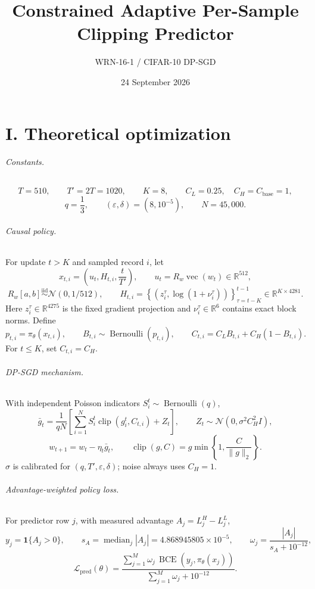 \documentclass[10pt]{article}
\title{Constrained Adaptive Per-Sample Clipping Predictor}
\author{WRN-16-1 / CIFAR-10 DP-SGD}
\date{24 September 2026}
\newcommand{\R}{\mathbb{R}}
\newcommand{\clip}{\operatorname{clip}}
\newcommand{\BCE}{\operatorname{BCE}}
\newcommand{\1}{\mathbf{1}}
\begin{document}
\maketitle
\vspace{-1.5em}

\part*{I. Theoretical optimization}

\paragraph{Constants.}
\[
T=510,\qquad T'=2T=1020,\qquad K=8,\qquad
C_L=0.25,\quad C_H=C_{\mathrm{base}}=1,
\]
\[
q=\frac13,\qquad (\varepsilon,\delta)=(8,10^{-5}),\qquad
N=45{,}000.
\]

\paragraph{Causal policy.}
For update $t>K$ and sampled record $i$, let
\[
x_{t,i}=\left(u_t,H_{t,i},\frac{t}{T'}\right),\qquad
u_t=R_w\operatorname{vec}(w_t)\in\R^{512},
\]
\[
R_w[a,b]\overset{\mathrm{iid}}{\sim}\mathcal N(0,1/512),\qquad
H_{t,i}=\left\{(z_i^\tau,\log(1+\nu_i^\tau))\right\}_{\tau=t-K}^{t-1}
\in\R^{K\times4281}.
\]
Here $z_i^\tau\in\R^{4275}$ is the fixed gradient projection and
$\nu_i^\tau\in\R^6$ contains exact block norms. Define
\[
p_{t,i}=\pi_\theta(x_{t,i}),\qquad
B_{t,i}\sim\operatorname{Bernoulli}(p_{t,i}),\qquad
C_{t,i}=C_LB_{t,i}+C_H(1-B_{t,i}).
\]
For $t\le K$, set $C_{t,i}=C_H$.

\paragraph{DP-SGD mechanism.}
With independent Poisson indicators $S_i^t\sim\operatorname{Bernoulli}(q)$,
\[
\bar g_t=\frac{1}{qN}\left[
\sum_{i=1}^{N}S_i^t\clip(g_i^t,C_{t,i})+Z_t\right],
\qquad Z_t\sim\mathcal N(0,\sigma^2C_H^2I),
\]
\[
w_{t+1}=w_t-\eta_t\bar g_t,
\qquad \clip(g,C)=g\min\left\{1,\frac{C}{\lVert g\rVert_2}\right\}.
\]
$\sigma$ is calibrated for $(q,T',\varepsilon,\delta)$; noise always uses
$C_H=1$.

\paragraph{Advantage-weighted policy loss.}
For predictor row $j$, with measured advantage $A_j=L_j^H-L_j^L$,
\[
y_j=\1\{A_j>0\},\qquad
s_A=\operatorname{median}_j|A_j|=4.868945805\times10^{-5},\qquad
\omega_j=\frac{|A_j|}{s_A+10^{-12}},
\]
\[
\mathcal L_{\mathrm{pred}}(\theta)=
\frac{\sum_{j=1}^{M}\omega_j\,
\BCE\!\left(y_j,\pi_\theta(x_j)\right)}
{\sum_{j=1}^{M}\omega_j+10^{-12}}.
\]
\end{document}
